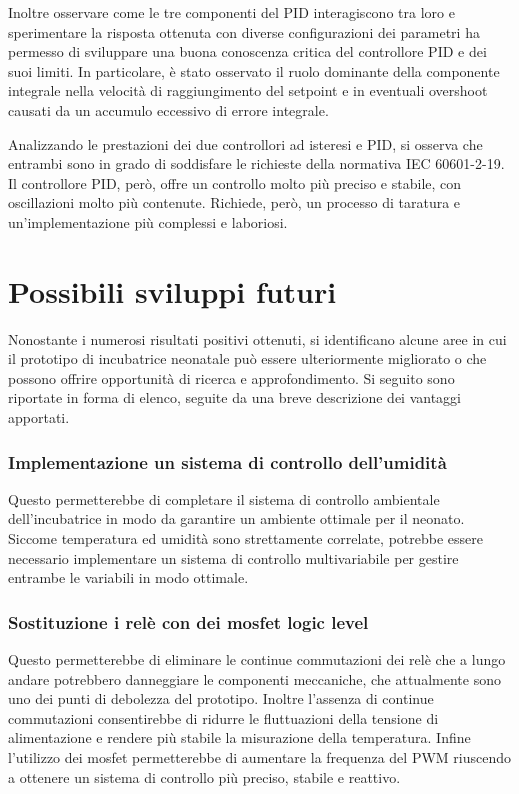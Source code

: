 Inoltre osservare come le tre componenti del PID interagiscono tra loro e sperimentare la risposta ottenuta con diverse
configurazioni dei parametri ha permesso di sviluppare una buona conoscenza critica del controllore PID e dei suoi limiti.
In particolare, è stato osservato il ruolo dominante della componente integrale nella velocità di raggiungimento del setpoint
e in eventuali overshoot causati da un accumulo eccessivo di errore integrale.

Analizzando le prestazioni dei due controllori ad isteresi e PID, si osserva che entrambi sono in grado di soddisfare le
richieste della normativa IEC 60601-2-19. Il controllore PID, però, offre un controllo molto più preciso e stabile, con
oscillazioni molto più contenute. Richiede, però, un processo di taratura e un'implementazione più complessi e laboriosi.

\newpage

\section{Possibili sviluppi futuri}
Nonostante i numerosi risultati positivi ottenuti, si identificano alcune aree in cui il prototipo di incubatrice neonatale
può essere ulteriormente migliorato o che possono offrire opportunità di ricerca e approfondimento. Si seguito sono
riportate in forma di elenco, seguite da una breve descrizione dei vantaggi apportati.

\subsubsection{Implementazione un sistema di controllo dell'umidità}
Questo permetterebbe di completare il sistema di controllo ambientale dell'incubatrice in modo da garantire un ambiente
ottimale per il neonato. Siccome temperatura ed umidità sono strettamente correlate, potrebbe essere necessario implementare
un sistema di controllo multivariabile per gestire entrambe le variabili in modo ottimale. \cite{woldeamanuel2024}

\subsubsection{Sostituzione i relè con dei mosfet logic level}
Questo permetterebbe di eliminare le continue commutazioni dei relè che a lungo andare potrebbero danneggiare le componenti
meccaniche, che attualmente sono uno dei punti di debolezza del prototipo. Inoltre l'assenza di continue commutazioni
consentirebbe di ridurre le fluttuazioni della tensione di alimentazione e rendere più stabile la misurazione della
temperatura. Infine l'utilizzo dei mosfet permetterebbe di aumentare la frequenza del PWM riuscendo a ottenere un
sistema di controllo più preciso, stabile e reattivo.

